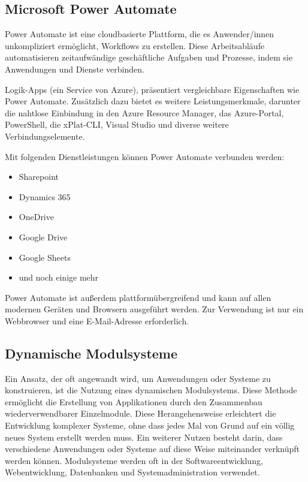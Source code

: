 \subsection*{Microsoft Power Automate}

Power Automate ist eine cloudbasierte Plattform, die es Anwender/innen unkompliziert ermöglicht, 
Workflows zu erstellen. Diese Arbeitsabläufe automatisieren zeitaufwändige 
geschäftliche Aufgaben und Prozesse, indem sie Anwendungen und Dienste verbinden. \cite{power_automate}

Logik-Apps (ein Service von Azure), 
präsentiert vergleichbare Eigenschaften wie Power Automate. Zusätzlich dazu 
bietet es weitere Leistungsmerkmale, darunter die nahtlose Einbindung in den 
Azure Resource Manager, das Azure-Portal, PowerShell, die xPlat-CLI, Visual Studio und 
diverse weitere Verbindungselemente. \cite{power_automate}

Mit folgenden Dienstleistungen können Power Automate verbunden werden:

\begin{itemize}
    \item Sharepoint
    \item Dynamics 365
    \item OneDrive
    \item Google Drive
    \item Google Sheets
    \item und noch einige mehr
\end{itemize}

Power Automate ist außerdem plattformübergreifend und kann auf allen modernen Geräten und Browsern
ausgeführt werden. Zur Verwendung ist nur ein Webbrowser und eine E-Mail-Adresse erforderlich.
\cite{power_automate}

\newpage
\subsection*{Dynamische Modulsysteme}

Ein Ansatz, der oft angewandt wird, um Anwendungen oder Systeme zu konstruieren, 
ist die Nutzung eines dynamischen Modulsystems. Diese Methode ermöglicht die Erstellung 
von Applikationen durch den Zusammenbau wiederverwendbarer Einzelmodule. 
Diese Herangehensweise erleichtert die Entwicklung komplexer Systeme, ohne dass jedes 
Mal von Grund auf ein völlig neues System erstellt werden muss. Ein weiterer Nutzen besteht darin, 
dass verschiedene Anwendungen oder Systeme auf diese Weise miteinander verknüpft werden können.
Modulsysteme werden oft in der Softwareentwicklung, Webentwicklung, 
Datenbanken und Systemadministration verwendet. \cite{modulsystem}

